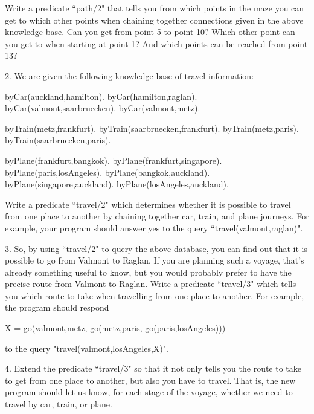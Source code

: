 Write a predicate ``path/2" that tells you from which points
in the maze you can get to which other points when chaining together
connections given in the above knowledge base. Can you get from point
5 to point 10? Which other point can you get to when starting at point
1? And which points can be reached from point 13?

2. We are given the following knowledge base of travel information:
\begin{LPNcodedisplay}
byCar(auckland,hamilton).
byCar(hamilton,raglan).
byCar(valmont,saarbruecken).
byCar(valmont,metz).

byTrain(metz,frankfurt).
byTrain(saarbruecken,frankfurt).
byTrain(metz,paris).
byTrain(saarbruecken,paris).

byPlane(frankfurt,bangkok).
byPlane(frankfurt,singapore).
byPlane(paris,losAngeles).
byPlane(bangkok,auckland).
byPlane(singapore,auckland).
byPlane(losAngeles,auckland).
\end{LPNcodedisplay}

Write a predicate ``travel/2" which determines whether it is
possible to travel from one place to another by chaining together
car, train, and plane journeys. For example, your program should answer
yes to the query ``travel(valmont,raglan)".

3. So, by using ``travel/2" to query the above database, you can
find out that it is possible to go from Valmont to Raglan.  If you are
planning such a voyage, that's already something useful to know, but
you would probably prefer to have the precise route from Valmont to
Raglan.  Write a predicate ``travel/3" which tells you which route to
take when travelling from one place to another.  For example, the
program should respond
\begin{LPNcodedisplay}
X = go(valmont,metz,
       go(metz,paris,
          go(paris,losAngeles)))
\end{LPNcodedisplay}
to the query
"travel(valmont,losAngeles,X)".

4. Extend the predicate ``travel/3" so that it not only tells you
the route to take to get from one place to another, but also
 you have to travel. That is, the new program should let
us know, for each stage of the voyage, whether we need to travel by
car, train, or plane.



